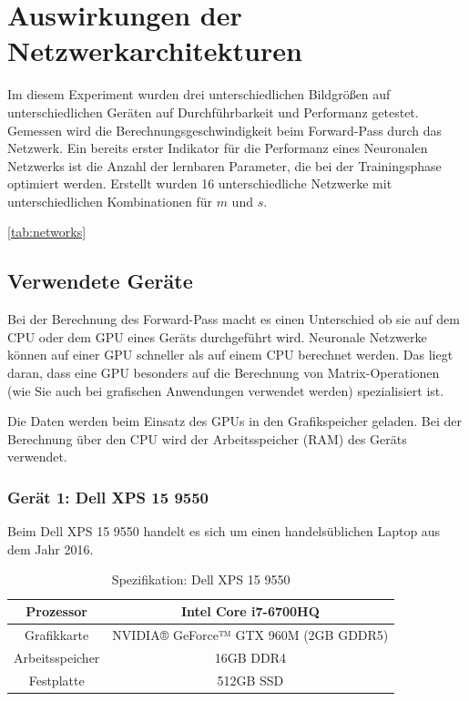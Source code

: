 \section{Auswirkungen der Netzwerkarchitekturen}

Im diesem Experiment wurden drei unterschiedlichen Bildgrößen auf unterschiedlichen Geräten auf Durchführbarkeit und Performanz getestet.
Gemessen wird die Berechnungsgeschwindigkeit beim Forward-Pass durch das Netzwerk. Ein bereits erster Indikator für die Performanz eines Neuronalen Netzwerks ist die Anzahl der lernbaren Parameter, die bei der Trainingsphase optimiert werden. Erstellt wurden 16 unterschiedliche Netzwerke mit unterschiedlichen Kombinationen für $ m $ und $ s $. 

\ref{tab:networks}

\subsection{Verwendete Geräte}

Bei der Berechnung des Forward-Pass macht es einen Unterschied ob sie auf dem CPU oder dem GPU eines Geräts durchgeführt wird. Neuronale Netzwerke können auf einer GPU schneller als auf einem CPU berechnet werden. Das liegt daran, dass eine GPU besonders auf die Berechnung von Matrix-Operationen (wie Sie auch bei grafischen Anwendungen verwendet werden) spezialisiert ist.

Die Daten werden beim Einsatz des GPUs in den Grafikspeicher geladen. Bei der Berechnung über den CPU wird der Arbeitsspeicher (RAM) des Geräts verwendet.

\subsubsection{Gerät 1: Dell XPS 15 9550}

Beim Dell XPS 15 9550 handelt es sich um einen handelsüblichen Laptop aus dem Jahr 2016.

\begin{table}[H]
    \centering
    \begin{tabular}{ |c|c| }
        \hline
        Prozessor       & Intel Core i7-6700HQ \\ \hline
        Grafikkarte     & NVIDIA® GeForce™ GTX 960M (2GB GDDR5) \\ \hline
        Arbeitsspeicher & 16GB DDR4  \\ \hline
        Festplatte      & 512GB SSD \\ \hline
    \end{tabular}
    \caption{Spezifikation: Dell XPS 15 9550}
    \label{tab:xps15}
\end{table}

